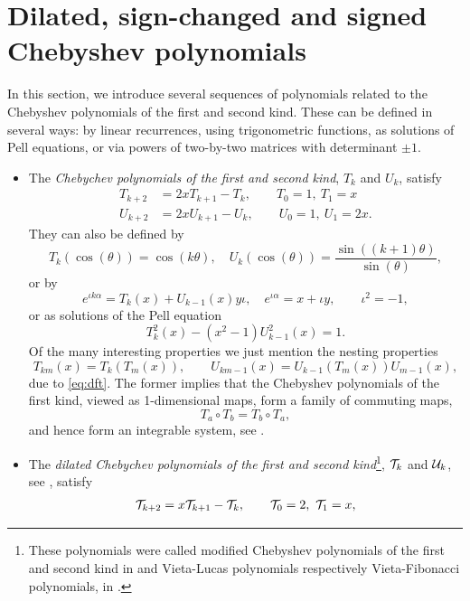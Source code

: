 \documentclass[a4paper,fleqn]{cas-sc}
\begin{document}
\section{Dilated, sign-changed and signed Chebyshev polynomials}
\label{sec:sec2}
In this section, we introduce several sequences of polynomials related to the Chebyshev polynomials of the first and second kind. These can be defined in several ways: by linear recurrences, using trigonometric functions, as solutions of Pell equations, or via powers of two-by-two matrices with determinant $\pm1$. 
\begin{itemize}
\item The {\em Chebychev polynomials of the first and second kind}, $T_k$ and $U_k$, satisfy
\begin{align*}
T_{k+2}&=2xT_{k+1}-T_k,\qquad T_0=1,\ T_1=x\\
U_{k+2}&=2xU_{k+1}-U_k,\qquad U_0=1,\ U_1=2x.
\end{align*}
They can also be defined by
\begin{equation} \label{eq:dft}
T_k(\cos(\theta))=\cos(k\theta),\quad
U_k(\cos(\theta))=\frac{\sin((k+1)\theta)}{\sin(\theta)},
\end{equation}
or by
\[
e^{\iota k\alpha}=T_k(x)+U_{k-1}(x)y\iota, \quad e^{\iota\alpha}=x+\iota y,\qquad \iota^2=-1,
\]
or as solutions of the Pell equation
\[
T_k^2(x)-(x^2-1)U_{k-1}^2(x)=1.
\]
Of the many interesting properties we just mention the nesting properties
\begin{equation} \label{eq:nps}
T_{km}(x)=T_k(T_m(x)),\qquad U_{km-1}(x)=U_{k-1}(T_m(x))U_{m-1}(x),
\end{equation}
due to \eqref{eq:dft}. The former implies that the Chebyshev polynomials of the first kind, viewed as 1-dimensional maps, form a family of commuting maps, 
\[
T_a\circ T_b=T_b\circ T_a,
\]
and hence form an integrable system, see \cite{Ves}. %
\item The {\em dilated Chebychev polynomials of the first and second kind}\footnote{These polynomials were called modified Chebyshev polynomials of the first and second kind in \cite{RoDa} and Vieta-Lucas polynomials respectively  Vieta-Fibonacci polynomials, in \cite{Hor}.}, ${\cal T}_k$ and ${\cal U}_k$, see \cite{Andy}, satisfy
\begin{align*}
{\cal T}_{k+2}&=x{\cal T}_{k+1}-{\cal T}_k,\qquad {\cal T}_0=2,\ {\cal T}_1=x,\\

\end{align*}
\end{itemize}
\end{document}
